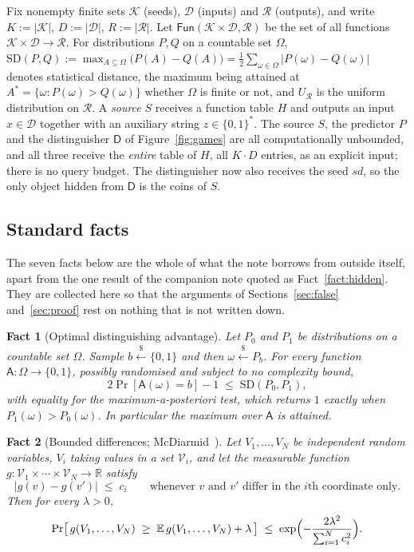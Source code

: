 \documentclass{conjura-solution}
\newcommand{\Fun}{\mathsf{Fun}}
\newcommand{\sd}{\mathit{sd}}
\renewcommand{\sample}{\stackrel{{\scriptscriptstyle\$}}{\leftarrow}}
\newcommand{\SD}{\mathrm{SD}}
\newcommand{\calK}{\mathcal{K}}
\newcommand{\calD}{\mathcal{D}}
\newcommand{\calR}{\mathcal{R}}
\newtheorem{fact}{Fact}
\begin{document}
Fix nonempty finite sets $\calK$ (seeds), $\calD$ (inputs) and $\calR$ (outputs), and write
$K := |\calK|$, $D := |\calD|$, $R := |\calR|$. Let $\Fun(\calK \times \calD, \calR)$ be the set of
all functions $\calK \times \calD \to \calR$. For distributions $P, Q$ on a countable set $\Omega$,
\(
  \SD(P,Q) := \max_{A \subseteq \Omega}\bigl(P(A) - Q(A)\bigr)
            = \tfrac12 \sum_{\omega \in \Omega} |P(\omega) - Q(\omega)|
\)
denotes statistical distance, the maximum being attained at
$A^{*} = \{\omega : P(\omega) > Q(\omega)\}$ whether $\Omega$ is finite or not, and $U_{\calR}$ is the uniform distribution on $\calR$. A
\emph{source} $S$ receives a function table $H$ and outputs an input $x \in \calD$ together with an
auxiliary string $z \in \{0,1\}^{*}$. The source $S$, the predictor $P$ and the distinguisher $\mathsf{D}$ of
Figure~\ref{fig:games} are all computationally unbounded, and all three receive the \emph{entire}
table of $H$, all $K \cdot D$ entries, as an explicit input; there is no query budget. The
distinguisher now also receives the seed $\sd$, so the only object hidden from $\mathsf{D}$ is the
coins of $S$.

\subsection{Standard facts}\label{sec:facts}

The seven facts below are the whole of what the note borrows from outside itself, apart from the
one result of the companion note quoted as Fact~\ref{fact:hidden}. They are collected here so
that the arguments of Sections~\ref{sec:false} and~\ref{sec:proof} rest on nothing that is not
written down.

\begin{fact}[Optimal distinguishing advantage]\label{fact:sd}
Let $P_0$ and $P_1$ be distributions on a countable set $\Omega$. Sample $b \sample \{0,1\}$ and
then $\omega \sample P_b$. For every function $\mathsf{A} \colon \Omega \to \{0,1\}$, possibly
randomised and subject to no complexity bound,
\[
  2\Pr[\mathsf{A}(\omega) = b] - 1 \;\le\; \SD(P_0,P_1) ,
\]
with equality for the maximum-a-posteriori test, which returns $1$ exactly when
$P_1(\omega) > P_0(\omega)$. In particular the maximum over $\mathsf{A}$ is attained.
\end{fact}

\begin{fact}[Bounded differences; McDiarmid~\cite{McD89}]\label{fact:mcd}
Let $V_1, \dots, V_N$ be independent random variables, $V_i$ taking values in a set
$\mathcal{V}_i$, and let the measurable function
$g \colon \mathcal{V}_1 \times \cdots \times \mathcal{V}_N \to \mathbb{R}$ satisfy
\[
  |g(v) - g(v')| \;\le\; c_i
  \qquad\text{whenever $v$ and $v'$ differ in the $i$th coordinate only.}
\]
Then for every $\lambda > 0$,
\[
  \Pr\bigl[\, g(V_1,\dots,V_N) \;\ge\; \mathbb{E}\,g(V_1,\dots,V_N) + \lambda \,\bigr]
  \;\le\; \exp\Bigl(-\frac{2\lambda^{2}}{\sum_{i=1}^{N} c_i^{2}}\Bigr) .
\]
\end{fact}
\end{document}
